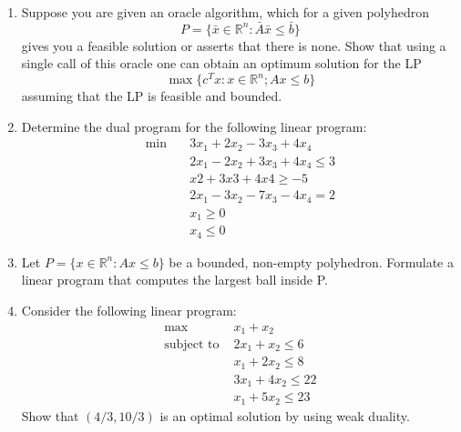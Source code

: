 \documentclass[11pt]{article}
\institute{\'Ecole Polytechnique F\'ed\'erale de Lausanne}
\newcommand{\setR}{\mathbb{R}}
\renewcommand{\leq}{\leqslant}
\begin{document}
\makeheader

\begin{enumerate}[1)]

\item Suppose you are given an oracle algorithm, which for a given polyhedron
$$P= \{\bar{x}∈\setR^n: \bar{A}\bar{x} \leq \bar{b}\}$$
gives you a feasible solution or asserts that there is none. Show that using a single call of this oracle
one can obtain an optimum solution for the LP
$$\max\{c^T x : x∈\setR^n; Ax≤b\}$$
assuming that the LP is feasible and bounded.




\item Determine the dual program for the following linear program:
\begin{align*}
\min \quad& 3x_1 + 2x_2−3x_3 + 4x_4 \\
&2x_1−2x_2 + 3x_3 + 4x_4 ≤ 3 \\
& x2 + 3x3 + 4x4 ≥ −5 \\
&2x_1−3x_2−7x_3−4x_4 = 2 \\
&x_1 ≥0 \\
& x_4 ≤0
\end{align*}



\item Let $P= \{x ∈\setR^n : Ax ≤b\}$ be a bounded, non-empty polyhedron. Formulate a linear program that
computes the largest ball inside P.




\item Consider the following linear program:
\begin{align*}
\max \quad & x_1 + x_2 \\
\text{subject to }&2x_1 + x_2 ≤6 \\
&x_1 + 2x_2 ≤8 \\
& 3x_1 + 4x_2 ≤ 22\\
& x_1 + 5x_2 ≤ 23
\end{align*}
Show that $(4/3, 10/3)$ is an optimal solution by using weak duality.




\end{enumerate}



  
\end{document}
